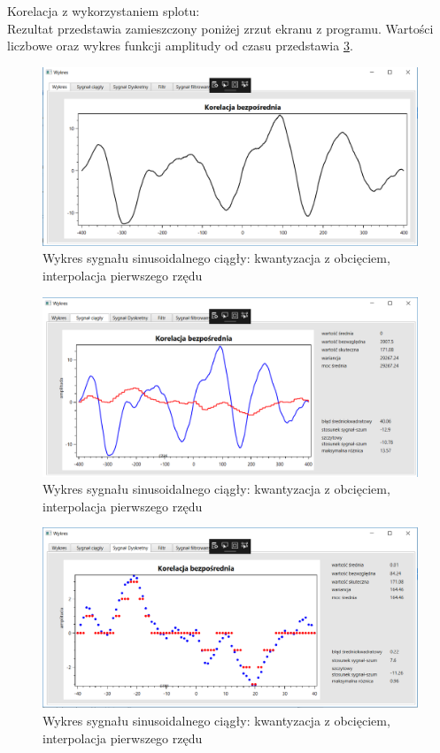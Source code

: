 \documentclass[12pt]{article}
\begin{document}
Korelacja z wykorzystaniem splotu:
\\Rezultat przedstawia zamieszczony poniżej zrzut ekranu z programu. Wartości liczbowe oraz wykres funkcji amplitudy od czasu przedstawia \ref{Wykres dla wynikw eksperymentu pierwszego}.
\begin{figure}[h!]
 \centering
 \includegraphics[width=12.3cm]{korB.PNG}
 \vspace{-0.3cm}
 \caption{Wykres sygnału sinusoidalnego ciągły: kwantyzacja z obcięciem, interpolacja pierwszego rzędu}
 \label{Wykres dla wynikw eksperymentu pierwszego}
\end{figure}
 \newpage
\begin{figure}[h!]
 \centering
 \includegraphics[width=12.3cm]{korBC.PNG}
 \vspace{-0.3cm}
 \caption{Wykres sygnału sinusoidalnego ciągły: kwantyzacja z obcięciem, interpolacja pierwszego rzędu}
 \label{Wykres dla wynikw eksperymentu pierwszego}
\end{figure}

\newpage
\begin{figure}[h!]
 \centering
 \includegraphics[width=12.3cm]{korBD.PNG}
 \vspace{-0.3cm}
 \caption{Wykres sygnału sinusoidalnego ciągły: kwantyzacja z obcięciem, interpolacja pierwszego rzędu}
 \label{Wykres dla wynikw eksperymentu pierwszego}
\end{figure}
\end{document}
